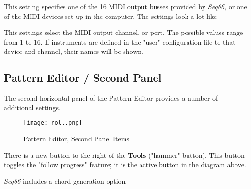    This setting specifies one of the 16 MIDI output busses provided by
   \textsl{Seq66}, or one of the MIDI devices set up in the computer.
   The settings look a lot like
   .

   This settings select the MIDI output channel, or port.
   The possible values range from 1 to 16.
   If instruments are defined in the "user" configuration file
   to that device and channel, their names will be shown.

\subsection{Pattern Editor / Second Panel}
\label{subsec:pattern_editor_second}

   The second horizontal panel of the Pattern Editor provides a number
   of additional settings.

\begin{figure}[H]
   \centering 
   \texttt{[image: roll.png]}
   \caption{Pattern Editor, Second Panel Items}
   \label{fig:pattern_editor_main_panel_items}
\end{figure}

   There is a new button to the right
   of the \textbf{Tools} ("hammer" button).  This button toggles the "follow
   progress" feature; it is the active button in the diagram above.


   \textsl{Seq66} includes a chord-generation option.



